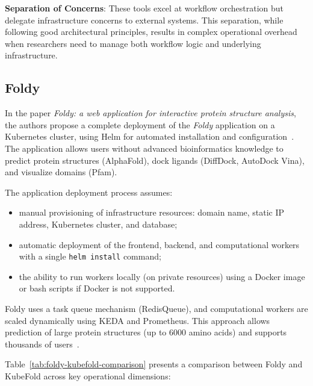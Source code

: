 \textbf{Separation of Concerns}: These tools excel at workflow orchestration but delegate infrastructure concerns to external systems.
This separation, while following good architectural principles, results in complex operational overhead when researchers need to manage both workflow logic and underlying infrastructure.

\subsection{Foldy}

In the paper \textit{Foldy: a web application for interactive protein structure analysis}, the authors propose a complete deployment of the \textit{Foldy} application on a Kubernetes cluster, using Helm for automated installation and configuration~\cite{foldy,helm}.
The application allows users without advanced bioinformatics knowledge to predict protein structures (AlphaFold), dock ligands (DiffDock, AutoDock Vina), and visualize domains (Pfam).

The application deployment process assumes:
\begin{itemize}
    \item manual provisioning of infrastructure resources: domain name, static IP address, Kubernetes cluster, and database;
    \item automatic deployment of the frontend, backend, and computational workers with a single \texttt{helm install} command;
    \item the ability to run workers locally (on private resources) using a Docker image or bash scripts if Docker is not supported.
\end{itemize}

Foldy uses a task queue mechanism (RedisQueue), and computational workers are scaled dynamically using KEDA and Prometheus.
This approach allows prediction of large protein structures (up to 6000 amino acids) and supports thousands of users~\cite{foldy}.

Table~\ref{tab:foldy-kubefold-comparison} presents a comparison between Foldy and KubeFold across key operational dimensions:

